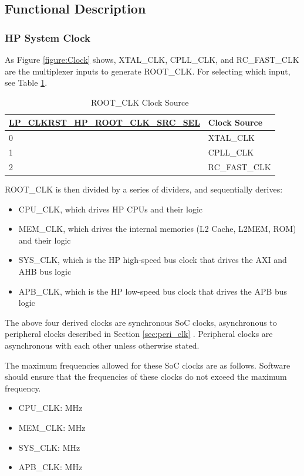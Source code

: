 \documentclass[main\_\_EN.tex]{subfiles}
\begin{document}
\subsection{Functional Description}

\subsubsection{HP System Clock}

As Figure \ref{figure:Clock} shows, XTAL\_CLK, CPLL\_CLK, and RC\_FAST\_CLK are the multiplexer inputs to generate ROOT\_CLK. For selecting which input, see Table \ref{tab:resclk-cpu-clk-src}.

\begin{longtable}[c]{|l|l| }
       \caption{ROOT\_CLK Clock Source}
		\label{tab:resclk-cpu-clk-src} \\
	    \hline
        \rowcolor{lightgray}
        \textbf{\hyperref[fielddesc:LPCLKRSTHPROOTCLKSRCSEL]{LP\_CLKRST\_HP\_ROOT\_CLK\_SRC\_SEL}} & \textbf{Clock Source} \\

        \hline
        0 & XTAL\_CLK \\
        \hline
        1 & CPLL\_CLK \\
        \hline
        2 & RC\_FAST\_CLK \\
        \hline
\end{longtable}

ROOT\_CLK is then divided by a series of dividers, and sequentially derives:
\begin{itemize}
    \item CPU\_CLK, which drives HP CPUs and their logic
    \item MEM\_CLK, which drives the internal memories (L2 Cache, L2MEM, ROM) and their logic
    \item SYS\_CLK, which is the HP high-speed bus clock that drives the AXI and AHB bus logic
    \item APB\_CLK, which is the HP low-speed bus clock that drives the APB bus logic
\end{itemize}

The above four derived clocks are synchronous SoC clocks, asynchronous to peripheral clocks described in Section \ref{sec:peri_clk} \textit{}. Peripheral clocks are asynchronous with each other unless otherwise stated.

The maximum frequencies allowed for these SoC clocks are as follows. Software should ensure that the frequencies of these clocks do not exceed the maximum frequency.
\begin{itemize}
    \item CPU\_CLK:  MHz
    \item MEM\_CLK:  MHz
    \item SYS\_CLK:  MHz
    \item APB\_CLK:  MHz
\end{itemize}
\end{document}
